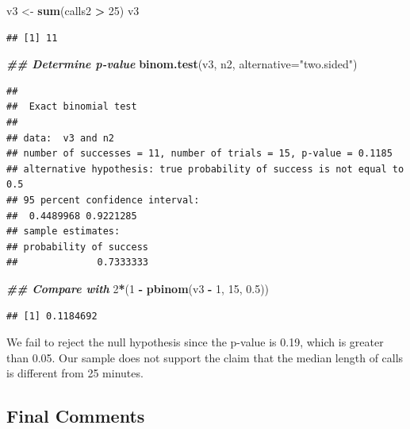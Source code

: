 \documentclass[
]{book}
\newenvironment{Shaded}{\begin{snugshade}}{\end{snugshade}}
\newcommand{\AttributeTok}[1]{\textcolor[rgb]{0.13,0.29,0.53}{#1}}
\newcommand{\DecValTok}[1]{\textcolor[rgb]{0.00,0.00,0.81}{#1}}
\newcommand{\DocumentationTok}[1]{\textcolor[rgb]{0.56,0.35,0.01}{\textbf{\textit{#1}}}}
\newcommand{\FloatTok}[1]{\textcolor[rgb]{0.00,0.00,0.81}{#1}}
\newcommand{\FunctionTok}[1]{\textcolor[rgb]{0.13,0.29,0.53}{\textbf{#1}}}
\newcommand{\NormalTok}[1]{#1}
\newcommand{\OtherTok}[1]{\textcolor[rgb]{0.56,0.35,0.01}{#1}}
\newcommand{\SpecialCharTok}[1]{\textcolor[rgb]{0.81,0.36,0.00}{\textbf{#1}}}
\newcommand{\StringTok}[1]{\textcolor[rgb]{0.31,0.60,0.02}{#1}}
\theoremstyle{definition}
\theoremstyle{definition}
\theoremstyle{definition}
\theoremstyle{definition}
\theoremstyle{remark}
\begin{document}
\begin{Shaded}
\begin{Highlighting}[]
\NormalTok{v3 }\OtherTok{\textless{}{-}} \FunctionTok{sum}\NormalTok{(calls2 }\SpecialCharTok{\textgreater{}} \DecValTok{25}\NormalTok{)}
\NormalTok{v3}
\end{Highlighting}
\end{Shaded}

\begin{verbatim}
## [1] 11
\end{verbatim}

\begin{Shaded}
\begin{Highlighting}[]
\DocumentationTok{\#\# Determine p{-}value}
\FunctionTok{binom.test}\NormalTok{(v3, n2, }\AttributeTok{alternative=}\StringTok{"two.sided"}\NormalTok{)}
\end{Highlighting}
\end{Shaded}

\begin{verbatim}
## 
##  Exact binomial test
## 
## data:  v3 and n2
## number of successes = 11, number of trials = 15, p-value = 0.1185
## alternative hypothesis: true probability of success is not equal to 0.5
## 95 percent confidence interval:
##  0.4489968 0.9221285
## sample estimates:
## probability of success 
##              0.7333333
\end{verbatim}

\begin{Shaded}
\begin{Highlighting}[]
\DocumentationTok{\#\# Compare with}
\DecValTok{2}\SpecialCharTok{*}\NormalTok{(}\DecValTok{1} \SpecialCharTok{{-}} \FunctionTok{pbinom}\NormalTok{(v3 }\SpecialCharTok{{-}} \DecValTok{1}\NormalTok{, }\DecValTok{15}\NormalTok{, }\FloatTok{0.5}\NormalTok{))}
\end{Highlighting}
\end{Shaded}

\begin{verbatim}
## [1] 0.1184692
\end{verbatim}

We fail to reject the null hypothesis since the p-value is 0.19, which is greater than 0.05. Our sample does not support the claim that the median length of calls is different from 25 minutes.

\hypertarget{final-comments}{%
\subsection{Final Comments}\label{final-comments}}
\end{document}
